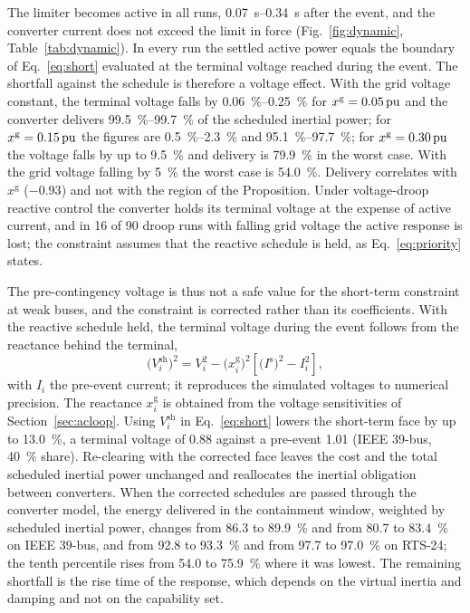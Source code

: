 The limiter becomes active in all runs, \SIrange{0.07}{0.34}{\second} after
the event, and the converter current does not exceed the limit in force
(Fig.~\ref{fig:dynamic}, Table~\ref{tab:dynamic}). In every run the settled active power equals the
boundary of Eq.~\eqref{eq:short} evaluated at the terminal voltage reached
during the event. The shortfall against the schedule is therefore a voltage
effect. With the grid voltage constant, the terminal voltage falls by
\SIrange{0.06}{0.25}{\percent} for $x^{\mathrm{g}} = \SI{0.05}{\ensuremath{\mathrm{pu}}}$ and the
converter delivers \SIrange{99.5}{99.7}{\percent} of the scheduled inertial
power; for $x^{\mathrm{g}} = \SI{0.15}{\ensuremath{\mathrm{pu}}}$ the figures are
\SIrange{0.5}{2.3}{\percent} and \SIrange{95.1}{97.7}{\percent}; for
$x^{\mathrm{g}} = \SI{0.30}{\ensuremath{\mathrm{pu}}}$ the voltage falls by up to
\SI{9.5}{\percent} and delivery is \SI{79.9}{\percent} in the worst case. With
the grid voltage falling by \SI{5}{\percent} the worst case is
\SI{54.0}{\percent}. Delivery correlates with $x^{\mathrm{g}}$ ($-0.93$) and
not with the region of the Proposition. Under voltage-droop reactive control
the converter holds its terminal voltage at the expense of active current,
and in \num{16} of \num{90} droop runs with falling grid voltage the active
response is lost; the constraint assumes that the reactive schedule is held,
as Eq.~\eqref{eq:priority} states.


The pre-contingency voltage is thus not a safe value for the short-term
constraint at weak buses, and the constraint is corrected rather than its
coefficients. With the reactive schedule held, the terminal voltage during
the event follows from the reactance behind the terminal,
%
\begin{equation}
  \bigl(V^{\mathrm{sh}}_i\bigr)^2 = V_i^2 - \bigl(x^{\mathrm{g}}_i\bigr)^2
    \left[ \bigl(I^{\mathrm{s}}\bigr)^2 - I_i^2 \right] ,
  \label{eq:shortvoltage}
\end{equation}
%
with $I_i$ the pre-event current; it reproduces the simulated voltages to
numerical precision. The reactance $x^{\mathrm{g}}_i$ is obtained from the
voltage sensitivities of Section~\ref{sec:acloop}. Using
$V^{\mathrm{sh}}_i$ in Eq.~\eqref{eq:short} lowers the short-term face by up
to \SI{13.0}{\percent}, a terminal voltage of \SI{0.88}{\pu} against a
pre-event \SI{1.01}{\pu} (IEEE 39-bus, \SI{40}{\percent} share). Re-clearing
with the corrected face leaves the cost and the total scheduled inertial
power unchanged and reallocates the inertial obligation between converters.
When the corrected schedules are passed through the converter model, the
energy delivered in the containment window, weighted by scheduled inertial
power, changes from \SI{86.3}{} to \SI{89.9}{\percent} and from \SI{80.7}{} to
\SI{83.4}{\percent} on IEEE 39-bus, and from \SI{92.8}{} to
\SI{93.3}{\percent} and from \SI{97.7}{} to \SI{97.0}{\percent} on RTS-24; the
tenth percentile rises from \SI{54.0}{} to \SI{75.9}{\percent} where it was
lowest. The remaining shortfall is the rise time of the response, which
depends on the virtual inertia and damping and not on the capability set.

